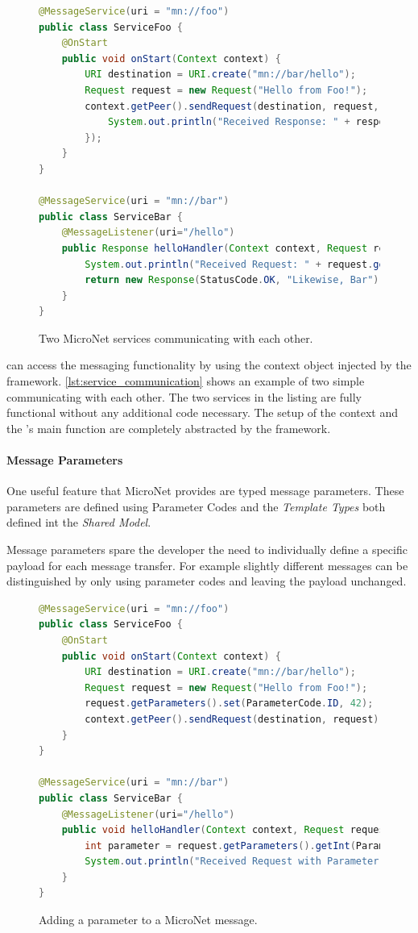 \begin{figure}
\begin{lstlisting}[language=Java,firstnumber=1] 
@MessageService(uri = "mn://foo")
public class ServiceFoo {
	@OnStart
	public void onStart(Context context) {
		URI destination = URI.create("mn://bar/hello");
		Request request = new Request("Hello from Foo!");
		context.getPeer().sendRequest(destination, request, response -> {
			System.out.println("Received Response: " + response.getData());
		});
	}
}

@MessageService(uri = "mn://bar")
public class ServiceBar {
	@MessageListener(uri="/hello")
	public Response helloHandler(Context context, Request request) {
		System.out.println("Received Request: " + request.getData());
		return new Response(StatusCode.OK, "Likewise, Bar");
	}
}
\end{lstlisting}
\caption{Two MicroNet services communicating with each other.}
\label{lst:service_communication}
\end{figure}

\mss{} can access the messaging functionality by using the context object
injected by the framework. \autoref{lst:service_communication} shows an example
of two simple \mss{} communicating with each other. The two services in the
listing are fully functional without any additional code necessary. The setup of
the context and the \ms{}'s main function are completely abstracted by the
framework.

\paragraph{Message Parameters}

One useful feature that MicroNet provides are typed message parameters. These
parameters are defined using Parameter Codes and the \textit{Template Types}
both defined int the \textit{Shared Model}.

Message parameters spare the developer the need to individually define a
specific payload for each message transfer. For example slightly different
messages can be distinguished by only using parameter codes and leaving the
payload unchanged.

\begin{figure}
\begin{lstlisting}[language=Java,firstnumber=1] 
@MessageService(uri = "mn://foo")
public class ServiceFoo {
	@OnStart
	public void onStart(Context context) {
		URI destination = URI.create("mn://bar/hello");
		Request request = new Request("Hello from Foo!");
		request.getParameters().set(ParameterCode.ID, 42);
		context.getPeer().sendRequest(destination, request);
	}
}

@MessageService(uri = "mn://bar")
public class ServiceBar {
	@MessageListener(uri="/hello")
	public void helloHandler(Context context, Request request) {
		int parameter = request.getParameters().getInt(ParameterCode.ID);
		System.out.println("Received Request with Parameter: " + parameter);
	}
}
\end{lstlisting}
\caption{Adding a parameter to a MicroNet message.}
\label{lst:message_parameters}
\end{figure}

